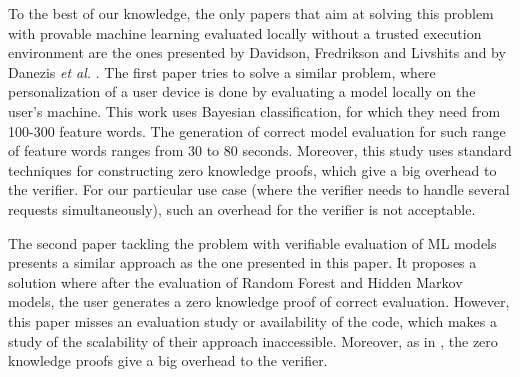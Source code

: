 To the best of our knowledge, the only papers that aim at solving this problem with provable machine learning evaluated locally without a trusted execution environment are the ones presented by Davidson, Fredrikson and Livshits \citep{Davidson:2014:MMO:2664243.2664266} and by Danezis \textit{et al.} \cite{Danezis:2012:PCP:2359015.2359018}. The first paper tries to solve a similar problem, where personalization of a user device is done by evaluating a model locally on the user's machine. This work uses Bayesian classification, for which they need from 100-300 feature words. The generation of correct model evaluation for such range of feature words ranges from 30 to 80 seconds. Moreover, this study uses standard techniques for constructing zero knowledge proofs, which give a big overhead to the verifier. For our particular use case (where the verifier needs to handle several requests simultaneously), such an overhead for the verifier is not acceptable. 

The second paper tackling the problem with verifiable evaluation of ML models \cite{Danezis:2012:PCP:2359015.2359018} presents a similar approach as the one presented in this paper. It proposes a solution where after the evaluation of  Random Forest and Hidden Markov models, the user generates a zero knowledge proof of correct evaluation. However, this paper misses an evaluation study or availability of the code, which makes a study of the scalability of their approach inaccessible. Moreover, as in \cite{Davidson:2014:MMO:2664243.2664266}, the zero knowledge proofs give a big overhead to the verifier. 